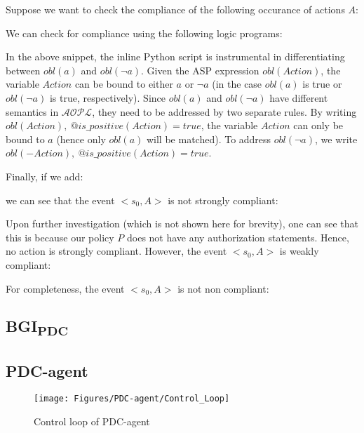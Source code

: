 Suppose we want to check the compliance of the following occurance of actions $A$:


We can check for compliance using the following logic programs:




In the above snippet, the inline Python script is instrumental in differentiating between $obl(a)$ and $obl(\neg a)$.
Given the ASP expression $obl(Action)$, the variable $Action$ can be bound to either $a$ or $\neg a$ (in the case $obl(a)$ is true or $obl(\neg a)$ is true, respectively).
Since $obl(a)$ and $obl(\neg a)$ have different semantics in $\mathcal{AOPL}$, they need to be addressed by two separate rules.
By writing $obl(Action), \ @is\_positive(Action) = true$, the variable $Action$ can only be bound to $a$ (hence only $obl(a)$ will be matched).
To address $obl(\neg a)$, we write $obl(-Action), \ @is\_positive(Action) = true$.

Finally, if we add:

we can see that the event $<s_0, A>$ is not strongly compliant:


Upon further investigation (which is not shown here for brevity), one can see that this is because our policy $P$ does not have any authorization statements.
Hence, no action is strongly compliant.
However, the event $<s_0, A>$ is weakly compliant:



For completeness, the event $<s_0, A>$ is not non compliant:



\subsection{\texorpdfstring{BGI\textsubscript{PDC}}{BGI-PDC}}

\subsection{PDC-agent}

\begin{landscape}
    \begin{figure}[h]
        \texttt{[image: Figures/PDC-agent/Control\_Loop]}
        \centering
        \caption{Control loop of PDC-agent}
        \label{fig:pdc_agent_control_loop}
    \end{figure}
\end{landscape}
